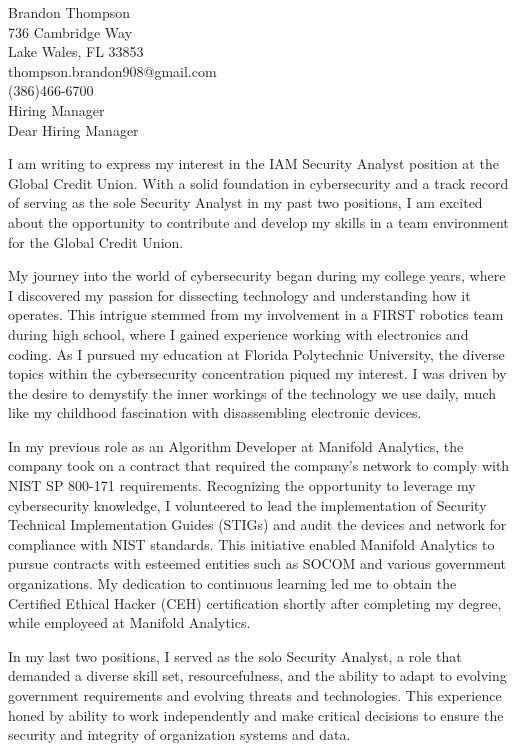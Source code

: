 \documentclass{resume} %
\newcommand\company{Global Credit Union}
\newcommand\position{IAM Security Analyst}
\begin{document}
Brandon Thompson\\
736 Cambridge Way\\
Lake Wales, FL 33853\\
thompson.brandon908@gmail.com\\
(386)466-6700\\


Hiring Manager\\

Dear Hiring Manager

I am writing to express my interest in the \position{} position at the \company{}.
With a solid foundation in cybersecurity and a track record of serving as the sole Security Analyst in my past two positions, I am excited about the opportunity to contribute and develop my skills in a team environment for the \company{}.

My journey into the world of cybersecurity began during my college years, where I discovered my passion for dissecting technology and understanding how it operates.
This intrigue stemmed from my involvement in a FIRST robotics team during high school, where I gained experience working with electronics and coding.
As I pursued my education at Florida Polytechnic University, the diverse topics within the cybersecurity concentration piqued my interest.
I was driven by the desire to demystify the inner workings of the technology we use daily, much like my childhood fascination with disassembling electronic devices.

In my previous role as an Algorithm Developer at Manifold Analytics, the company took on a contract that required the company's network to comply with NIST SP 800-171 requirements.
Recognizing the opportunity to leverage my cybersecurity knowledge, I volunteered to lead the implementation of Security Technical Implementation Guides (STIGs) and audit the devices and network for compliance with NIST standards.
This initiative enabled Manifold Analytics to pursue contracts with esteemed entities such as SOCOM and various government organizations.
My dedication to continuous learning led me to obtain the Certified Ethical Hacker (CEH) certification shortly after completing my degree, while employeed at Manifold Analytics.

In my last two positions, I served as the solo Security Analyst, a role that demanded a diverse skill set, resourcefulness, and the ability to adapt to evolving government requirements and evolving threats and technologies.
This experience honed by ability to work independently and make critical decisions to ensure the security and integrity of organization systems and data.
\end{document}
